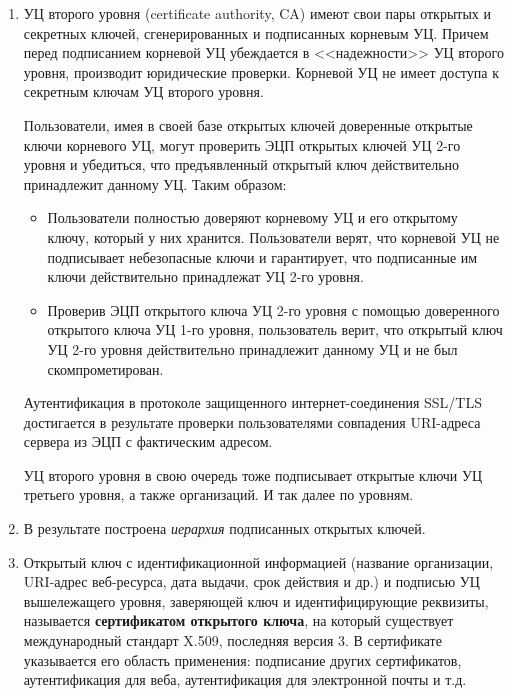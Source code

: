 \begin{enumerate}
    \item УЦ второго уровня (certificate authority, CA) имеют свои пары открытых и секретных ключей, сгенерированных и подписанных корневым УЦ. Причем перед подписанием корневой УЦ убеждается в <<надежности>> УЦ второго уровня, производит юридические проверки. Корневой УЦ не имеет доступа к секретным ключам УЦ второго уровня.

        Пользователи, имея в своей базе открытых ключей доверенные открытые ключи корневого УЦ, могут проверить ЭЦП открытых ключей УЦ 2-го уровня и убедиться, что предъявленный открытый ключ действительно принадлежит данному УЦ. Таким образом:
        \begin{itemize}
            \item Пользователи полностью доверяют корневому УЦ и его открытому ключу, который у них хранится. Пользователи верят, что корневой УЦ не подписывает небезопасные ключи и гарантирует, что подписанные им ключи действительно принадлежат УЦ 2-го уровня.
            \item Проверив ЭЦП открытого ключа УЦ 2-го уровня с помощью доверенного открытого ключа УЦ 1-го уровня, пользователь верит, что открытый ключ УЦ  2-го уровня действительно принадлежит данному УЦ и не был скомпрометирован.
        \end{itemize}

        Аутентификация в протоколе защищенного интернет-соединения SSL/TLS достигается в результате  проверки пользователями совпадения URI-адреса сервера из ЭЦП с фактическим адресом.

        УЦ второго уровня в свою очередь тоже подписывает открытые ключи УЦ третьего уровня, а также организаций.  И так далее по уровням.

    \item В результате построена \emph{иерархия} подписанных открытых ключей.

    \item Открытый ключ с идентификационной информацией (название организации, URI-адрес веб-ресурса, дата выдачи, срок действия и др.) и подписью УЦ вышележащего уровня, заверяющей ключ и идентифицирующие реквизиты, называется \textbf{сертификатом открытого ключа}, на который существует международный стандарт X.509, последняя версия 3. В сертификате указывается его область применения: подписание других сертификатов, аутентификация для веба, аутентификация для электронной почты и т.д.
\end{enumerate}


